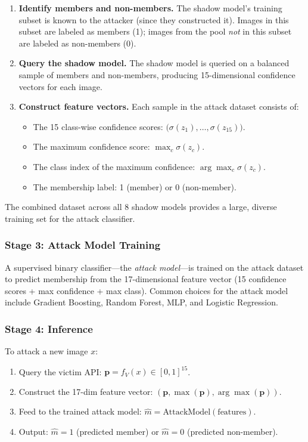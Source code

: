 \documentclass[conference]{IEEEtran}
\begin{document}
\begin{enumerate}[leftmargin=*]
    \item \textbf{Identify members and non-members.} The shadow model's training subset is known to the attacker (since they constructed it). Images in this subset are labeled as members (1); images from the pool \textit{not} in this subset are labeled as non-members (0).
    
    \item \textbf{Query the shadow model.} The shadow model is queried on a balanced sample of members and non-members, producing 15-dimensional confidence vectors for each image.
    
    \item \textbf{Construct feature vectors.} Each sample in the attack dataset consists of:
    \begin{itemize}
        \item The 15 class-wise confidence scores: $\big(\sigma(z_1), \ldots, \sigma(z_{15})\big)$.
        \item The maximum confidence score: $\max_c \sigma(z_c)$.
        \item The class index of the maximum confidence: $\arg\max_c \sigma(z_c)$.
        \item The membership label: 1 (member) or 0 (non-member).
    \end{itemize}
\end{enumerate}

The combined dataset across all 8 shadow models provides a large, diverse training set for the attack classifier.

\subsubsection{Stage 3: Attack Model Training}

A supervised binary classifier---the \textit{attack model}---is trained on the attack dataset to predict membership from the 17-dimensional feature vector (15 confidence scores + max confidence + max class). Common choices for the attack model include Gradient Boosting, Random Forest, MLP, and Logistic Regression.

\subsubsection{Stage 4: Inference}

To attack a new image $x$:
\begin{enumerate}[leftmargin=*]
    \item Query the victim API: $\mathbf{p} = f_V(x) \in [0, 1]^{15}$.
    \item Construct the 17-dim feature vector: $(\mathbf{p}, \max(\mathbf{p}), \arg\max(\mathbf{p}))$.
    \item Feed to the trained attack model: $\hat{m} = \text{AttackModel}(\text{features})$.
    \item Output: $\hat{m} = 1$ (predicted member) or $\hat{m} = 0$ (predicted non-member).
\end{enumerate}
\end{document}
